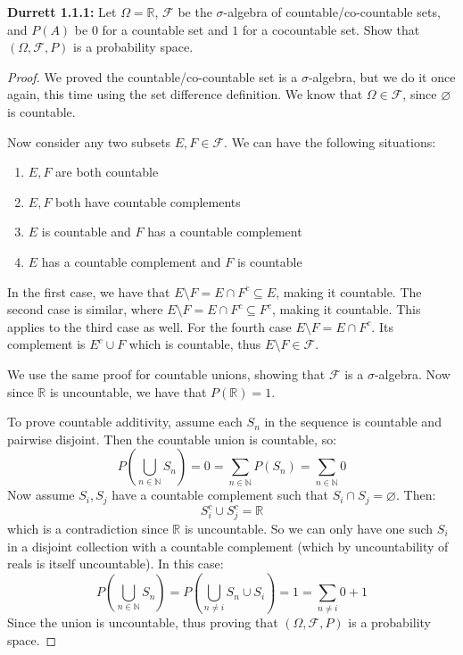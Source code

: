 \documentclass[10pt,letterpaper]{article} %
\begin{document}
\textbf{Durrett 1.1.1:} Let $\Omega = \mathbb{R}$, $\mathcal{F}$ be the $\sigma$-algebra of countable/co-countable sets, and $P(A)$ be $0$ for a countable set and $1$ for a cocountable set.
Show that $(\Omega, \mathcal{F}, P)$ is a probability space.
\begin{proof}
We proved the countable/co-countable set is a $\sigma$-algebra, but we do it once again, this time using the set difference definition. We know that $\Omega \in \mathcal{F}$, since $\varnothing$ is countable.

Now consider any two subsets $E, F \in \mathcal{F}$. We can have the following situations:
\begin{enumerate}
\item $E, F$ are both countable
\item $E, F$ both have countable complements
\item $E$ is countable and $F$ has a countable complement
\item $E$ has a countable complement and $F$ is countable
\end{enumerate}
In the first case, we have that $E \setminus F = E \cap F^c \subseteq E$, making it countable.
The second case is similar, where $E \setminus F = E \cap F^c \subseteq F^c$, making it countable.
This applies to the third case as well.
For the fourth case $E \setminus F = E \cap F^c$. Its complement is $E^c \cup F$ which is countable, thus $E \setminus F \in \mathcal{F}$. 

We use the same proof for countable unions, showing that $\mathcal{F}$ is a $\sigma$-algebra. Now since $\mathbb{R}$ is uncountable, we have that $P(\mathbb{R}) = 1$.

To prove countable additivity, assume each $S_n$ in the sequence is countable and pairwise disjoint. Then the countable union is countable, so:
\begin{equation*}
P\left(\bigcup_{n \in \mathbb{N}}S_n\right) = 0 = \sum_{n \in \mathbb{N}}P(S_n) = \sum_{n \in \mathbb{N}}0
\end{equation*}
Now assume $S_i, S_j$ have a countable complement such that $S_i \cap S_j = \varnothing$. Then:
\begin{equation*}
S_i ^c \cup S_j^c = \mathbb{R}
\end{equation*}
which is a contradiction since $\mathbb{R}$ is uncountable. So we can only have one such $S_i$ in a disjoint collection with a countable complement (which by uncountability of reals is itself uncountable). In this case:
\begin{equation*}
P\left(\bigcup_{n \in \mathbb{N}}S_n\right) = P\left(\bigcup_{n \neq i}S_n \cup S_i\right) = 1 = \sum_{n \neq i}0 + 1
\end{equation*}
Since the union is uncountable, thus proving that $(\Omega, \mathcal{F}, P)$ is a probability space.
\end{proof}
\end{document}
